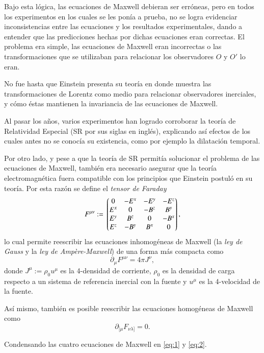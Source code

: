 Bajo esta lógica, las ecuaciones de Maxwell debieran ser erróneas, pero en todos los experimentos en los cuales se les ponía a prueba, no se logra evidenciar inconsistencias entre las ecuaciones y los resultados experimentales, dando a entender que las predicciones hechas por dichas ecuaciones eran correctas. El problema era simple, las ecuaciones de Maxwell eran incorrectas o las transformaciones que se utilizaban para relacionar los observadores $O$ y $O'$ lo eran.

No fue hasta que Einstein presenta su teoría en donde muestra las transformaciones de Lorentz como medio para relacionar observadores inerciales, y cómo éstas mantienen la invariancia de las ecuaciones de Maxwell.

Al pasar los años, varios experimentos han logrado corroborar la teoría de Relatividad Especial (SR por sus siglas en inglés), explicando así efectos de los cuales antes no se conocía su existencia, como por ejemplo la dilatación temporal.

Por otro lado, y pese a que la teoría de SR permitía solucionar el problema de las ecuaciones de Maxwell, también era necesario asegurar que la teoría electromagnética fuera compatible con los principios que Einstein postuló en su teoría. Por esta razón se define el \textit{tensor de Faraday}
\begin{equation}
F^{\mu \nu} := \mqty*(
0 & -E^x & -E^y & -E^z \\
E^x & 0 & -B^z & B^y \\
E^y & B^z & 0 & -B^x \\
E^z & -B^y & B^x & 0 \\ 
),
\end{equation}
lo cual permite reescribir las ecuaciones inhomogéneas de Maxwell (la \textit{ley de Gauss} y la \textit{ley de Ampère-Maxwell}) de una forma más compacta como
\begin{equation}
\label{eq:1}
\partial_{\mu} F^{\mu \nu} = 4\pi J^{\nu},
\end{equation}
donde $J^{\mu} := \rho_0 u^{\mu}$ es la 4-densidad de corriente, $\rho_0$ es la densidad de carga respecto a un sistema de referencia inercial con la fuente y $u^{\mu}$ es la 4-velocidad de la fuente.

Así mismo, también es posible reescribir las ecuaciones homogéneas de Maxwell como
\begin{equation}
\label{eq:2}
\partial_{[\mu} F_{\nu \lambda]} = 0.
\end{equation}

Condensando las cuatro ecuaciones de Maxwell en \eqref{eq:1} y \eqref{eq:2}.

